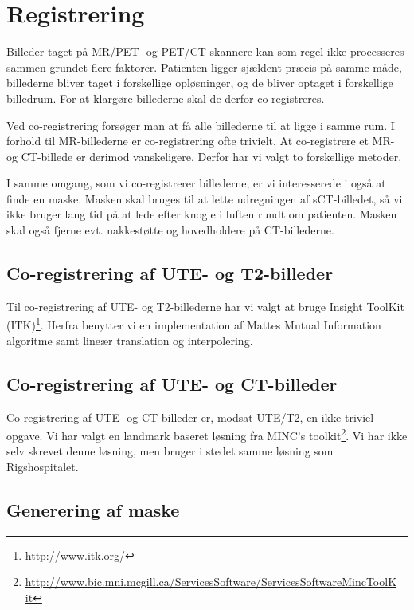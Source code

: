 \section{Registrering}

Billeder taget på MR/PET- og PET/CT-skannere kan som regel ikke
processeres sammen grundet flere faktorer. Patienten ligger sjældent
præcis på samme måde, billederne bliver taget i forskellige
opløsninger, og de bliver optaget i forskellige billedrum. For at
klargøre billederne skal de derfor co-registreres.

Ved co-registrering forsøger man at få alle billederne til at ligge i
samme rum. I forhold til MR-billederne er co-registrering ofte trivielt.
At co-registrere et MR- og CT-billede er derimod vanskeligere. Derfor har
vi valgt to forskellige metoder.

I samme omgang, som vi co-registrerer billederne, er vi interesserede i
også at finde en maske. Masken skal bruges til at lette udregningen
af sCT-billedet, så vi ikke bruger lang tid på at lede efter knogle i
luften rundt om patienten. Masken skal også fjerne evt. nakkestøtte og
hovedholdere på CT-billederne.

\subsection{Co-registrering af UTE- og T2-billeder}

Til co-registrering af UTE- og T2-billederne har vi valgt at bruge
Insight ToolKit (ITK)\footnote{\url{http://www.itk.org/}}. Herfra benytter vi en implementation af Mattes
Mutual Information algoritme samt lineær translation og interpolering.

\subsection{Co-registrering af UTE- og CT-billeder}

Co-registrering af UTE- og CT-billeder er, modsat UTE/T2, en ikke-triviel
opgave. Vi har valgt en landmark baseret løsning fra MINC's toolkit\footnote{\url{http://www.bic.mni.mcgill.ca/ServicesSoftware/ServicesSoftwareMincToolK it}}.
Vi har ikke selv skrevet denne løsning, men bruger i stedet samme
løsning som Rigshospitalet.

\subsection{Generering af maske}

